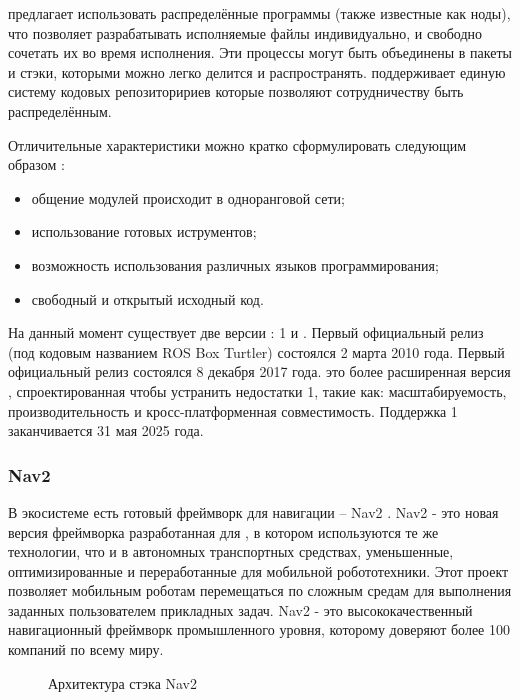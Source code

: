 \ros{} предлагает использовать распределённые программы (также известные как
ноды), что позволяет разрабатывать исполняемые файлы индивидуально, и свободно
сочетать их во время исполнения. Эти процессы могут быть объединены в пакеты и
стэки, которыми можно легко делится и распространять.
\ros{} поддерживает единую систему кодовых репозиторириев которые
позволяют сотрудничеству быть распределённым.

Отличительные характеристики \ros{} можно кратко сформулировать следующим образом
 \cite{quigley2009ros}:
\begin{itemize}
	\item общение модулей происходит в одноранговой сети;
	\item использование готовых иструментов;
	\item возможность использования различных языков программирования;
	\item свободный и открытый исходный код.
\end{itemize}

На данный момент существует две версии \ros{}: \ros{}1 и \rosTwo{}. Первый
официальный релиз \ros{} (под кодовым названием ROS Box Turtler) состоялся 2
марта 2010 года. Первый официальный релиз \rosTwo{} состоялся 8 декабря 2017
года. \rosTwo{} это более расширенная версия \ros{}, спроектированная чтобы
устранить недостатки \ros{} 1, такие как: масштабируемость, производительность и
кросс-платформенная совместимость. Поддержка \ros{} 1 заканчивается 31 мая 2025
года. 

\subsubsection{Nav2}
В экосистеме \ros{} есть готовый фреймворк для навигации -- Nav2
\cite{macenski2020marathon2}. Nav2 - это новая версия фреймворка
разработанная для \rosTwo{}, в котором используются те же технологии, что и в
автономных транспортных средствах, уменьшенные, оптимизированные и
переработанные для мобильной робототехники. Этот проект позволяет мобильным
роботам перемещаться по сложным средам для выполнения заданных пользователем
прикладных задач. Nav2 - это высококачественный навигационный фреймворк
промышленного уровня, которому доверяют более 100 компаний по всему миру.

\begin{figure}[h]
\centering
\caption{Архитектура стэка Nav2}
\end{figure}

